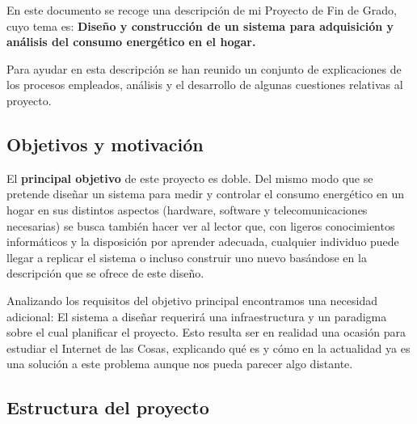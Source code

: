 \documentclass[a4paper,10pt]{article}
\begin{document}
En este documento se recoge una descripción de mi Proyecto de Fin de
Grado, cuyo tema es: \textbf{Diseño y construcción de un sistema para
  adquisición y análisis del consumo energético en el hogar.}

Para ayudar en esta descripción se han reunido un conjunto de
explicaciones de los procesos empleados, análisis y el desarrollo de
algunas cuestiones relativas al proyecto.

\subsection{Objetivos y motivación}\label{objetivos}

El \textbf{principal objetivo} de este proyecto es doble. Del mismo modo que se
pretende diseñar un sistema para medir y controlar el consumo
energético en un hogar en sus distintos aspectos (hardware, software y
telecomunicaciones necesarias) se busca también hacer ver al lector
que, con ligeros conocimientos informáticos y la disposición por
aprender adecuada, cualquier individuo puede llegar a replicar el
sistema o incluso construir uno nuevo basándose en la descripción que
se ofrece de este diseño.

Analizando los requisitos del objetivo principal encontramos una
necesidad adicional: El sistema a diseñar requerirá una
infraestructura y un paradigma sobre el cual planificar el
proyecto. Esto resulta ser en realidad una ocasión para estudiar el
Internet de las Cosas, explicando qué es y cómo en la actualidad ya es
una solución a este problema aunque nos pueda parecer algo distante.

\subsection{Estructura del proyecto}\label{estructura}
\end{document}
